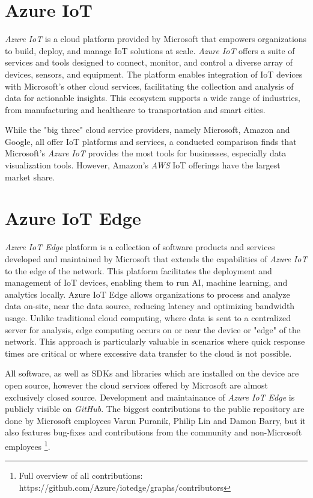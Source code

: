 \section{Azure IoT}
\textit{Azure IoT} is a cloud platform provided by Microsoft that
empowers organizations to build, deploy, and manage \ac{IoT} solutions at scale.
\textit{Azure IoT} offers a suite of services and tools designed to connect,
monitor, and control a diverse array of devices, sensors, and equipment. The
platform enables integration of \ac{IoT} devices with Microsoft's other cloud
services, facilitating the collection and analysis of data for actionable insights.
This ecosystem supports a wide range of industries, from manufacturing and
healthcare to transportation and smart cities\cite{msdoc-aziot}.

While the "big three" cloud service providers, namely Microsoft, Amazon and
Google, all offer \ac{IoT} platforms and services, a conducted comparison finds
that Microsoft's \textit{Azure IoT} provides the most tools for businesses,
especially data visualization tools. However, Amazon's \textit{AWS} \ac{IoT}
offerings have the largest market share\cite{9116254}.


\section{Azure IoT Edge}
\textit{Azure IoT Edge} platform is a collection of software  products and
services developed and maintained by Microsoft that extends the capabilities
of \textit{Azure IoT} to the edge of the network. This platform facilitates the
deployment and management of \ac{IoT} devices, enabling them to run \ac{AI},
machine learning, and analytics locally. Azure IoT Edge allows organizations to
process and analyze data on-site, near the data source, reducing latency and
optimizing bandwidth usage.
Unlike traditional cloud computing, where data is sent to a centralized server
for analysis, edge computing occurs on or near the device or "edge" of the
network. This approach is particularly valuable in scenarios where quick
response times are critical or where excessive data transfer to the cloud
is not possible\cite{msdoc-aziotedge}.

All software, as well as \ac{SDK}s and
libraries which are installed on the device are open source, however the
cloud services offered by Microsoft are almost exclusively closed source.
Development and maintainance of \textit{Azure IoT Edge} is publicly visible on
\textit{GitHub}. The biggest contributions
to the public repository are done by Microsoft employees Varun Puranik,
Philip Lin and Damon Barry, but it also features bug-fixes and contributions
from the community and non-Microsoft employees
\footnote{Full overview of all contributions: https://github.com/Azure/iotedge/graphs/contributors}.

